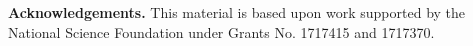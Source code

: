 \documentclass[conference]{IEEEtran}
\begin{document}






%






\smallskip \noindent \textbf{Acknowledgements.} 
This material is based upon work supported by the National Science Foundation under 
Grants No. 1717415 and 1717370.

\balance

\newpage


\end{document}
